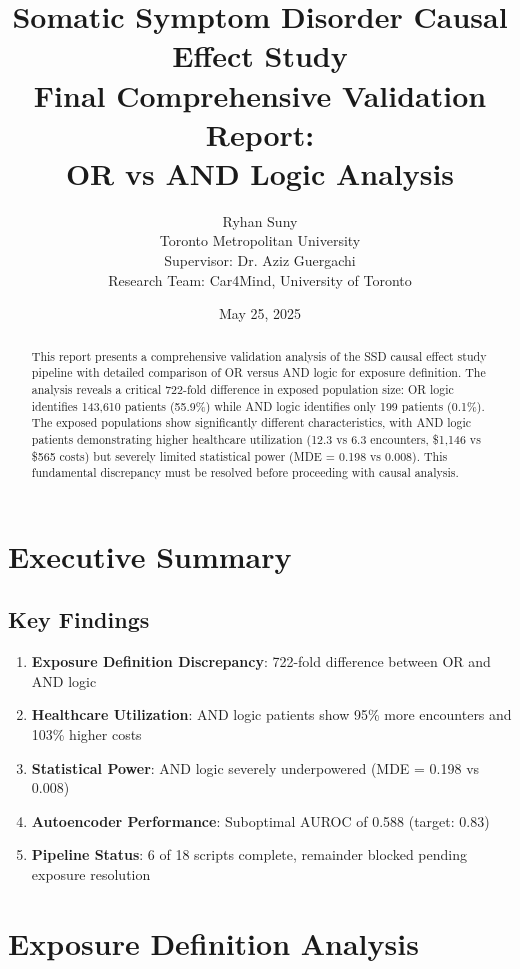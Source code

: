\documentclass[11pt]{article}
\title{Somatic Symptom Disorder Causal Effect Study\\
\large Final Comprehensive Validation Report:\\
\large OR vs AND Logic Analysis}
\author{Ryhan Suny\\
Toronto Metropolitan University\\
Supervisor: Dr. Aziz Guergachi\\
Research Team: Car4Mind, University of Toronto}
\date{May 25, 2025}
\begin{document}
\maketitle

\begin{abstract}
This report presents a comprehensive validation analysis of the SSD causal effect study pipeline with detailed comparison of OR versus AND logic for exposure definition. The analysis reveals a critical 722-fold difference in exposed population size: OR logic identifies 143,610 patients (55.9\%) while AND logic identifies only 199 patients (0.1\%). The exposed populations show significantly different characteristics, with AND logic patients demonstrating higher healthcare utilization (12.3 vs 6.3 encounters, \$1,146 vs \$565 costs) but severely limited statistical power (MDE = 0.198 vs 0.008). This fundamental discrepancy must be resolved before proceeding with causal analysis.
\end{abstract}

\tableofcontents
\newpage

\section{Executive Summary}

\subsection{Key Findings}

\begin{enumerate}
    \item \textcolor{alertred}{\textbf{Exposure Definition Discrepancy}}: 722-fold difference between OR and AND logic
    \item \textbf{Healthcare Utilization}: AND logic patients show 95\% more encounters and 103\% higher costs
    \item \textbf{Statistical Power}: AND logic severely underpowered (MDE = 0.198 vs 0.008)
    \item \textbf{Autoencoder Performance}: Suboptimal AUROC of 0.588 (target: 0.83)
    \item \textbf{Pipeline Status}: 6 of 18 scripts complete, remainder blocked pending exposure resolution
\end{enumerate}

\section{Exposure Definition Analysis}
\end{document}
